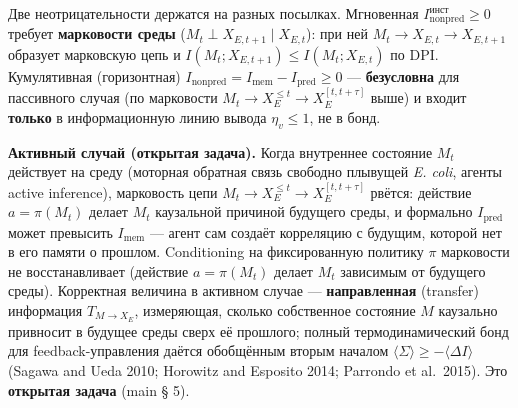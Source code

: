 \documentclass[pdflatex,sn-mathphys-ay]{sn-jnl}
\begin{document}
Две неотрицательности держатся на разных посылках. Мгновенная \(I_{\text{nonpred}}^{\text{инст}} \ge 0\) требует \textbf{марковости среды} (\(M_t \perp X_{E,t+1} \mid X_{E,t}\)): при ней \(M_t \to X_{E,t} \to X_{E,t+1}\) образует марковскую цепь и \(I(M_t; X_{E,t+1}) \le I(M_t; X_{E,t})\) по DPI. Кумулятивная (горизонтная) \(I_{\text{nonpred}} = I_{\text{mem}} - I_{\text{pred}} \ge 0\) --- \textbf{безусловна} для пассивного случая (по марковости \(M_t \to X_E^{\le t} \to X_E^{[t, t+\tau]}\) выше) и входит \textbf{только} в информационную линию вывода \(\eta_v \le 1\), не в бонд.

\textbf{Активный случай (открытая задача).} Когда внутреннее состояние \(M_t\) действует на среду (моторная обратная связь свободно плывущей \emph{E. coli}, агенты active inference), марковость цепи \(M_t \to X_E^{\le t} \to X_E^{[t, t+\tau]}\) рвётся: действие \(a = \pi(M_t)\) делает \(M_t\) каузальной причиной будущего среды, и формально \(I_{\text{pred}}\) может превысить \(I_{\text{mem}}\) --- агент сам создаёт корреляцию с будущим, которой нет в его памяти о прошлом. Conditioning на фиксированную политику \(\pi\) марковости не восстанавливает (действие \(a = \pi(M_t)\) делает \(M_t\) зависимым от будущего среды). Корректная величина в активном случае --- \textbf{направленная} (transfer) информация \(T_{M \to X_E}\), измеряющая, сколько собственное состояние \(M\) каузально привносит в будущее среды сверх её прошлого; полный термодинамический бонд для feedback-управления даётся обобщённым вторым началом \(\langle\Sigma\rangle \ge -\langle\Delta I\rangle\) (Sagawa and Ueda 2010; Horowitz and Esposito 2014; Parrondo et al.~2015). Это \textbf{открытая задача} (main § 5).
\end{document}
